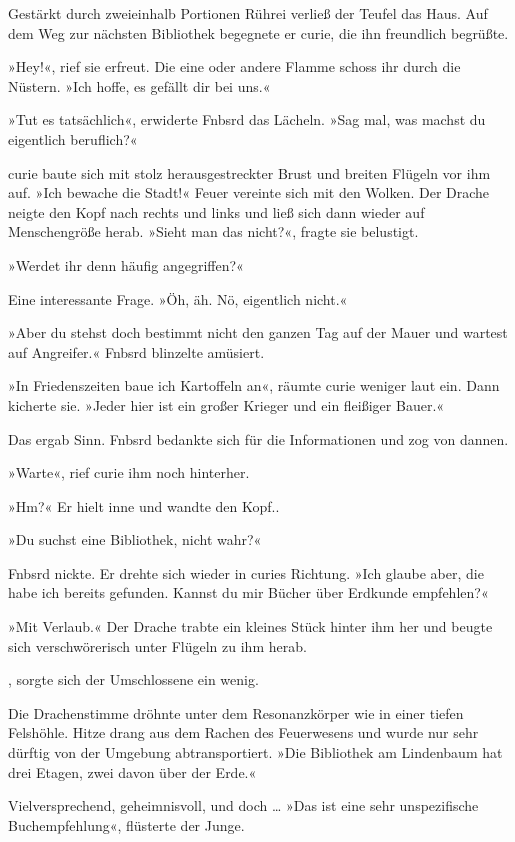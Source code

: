 Gestärkt durch zweieinhalb Portionen Rührei verließ der Teufel das Haus. Auf dem Weg zur nächsten Bibliothek begegnete er curie, die ihn freundlich begrüßte.

»Hey!«, rief sie erfreut. Die eine oder andere Flamme schoss ihr durch die Nüstern. »Ich hoffe, es gefällt dir bei uns.«

»Tut es tatsächlich«, erwiderte Fnbsrd das Lächeln. »Sag mal, was machst du eigentlich beruflich?«

curie baute sich mit stolz herausgestreckter Brust und breiten Flügeln vor ihm auf. »Ich bewache die Stadt!« Feuer vereinte sich mit den Wolken. Der Drache neigte den Kopf nach rechts und links und ließ sich dann wieder auf Menschengröße herab. »Sieht man das nicht?«, fragte sie belustigt.

»Werdet ihr denn häufig angegriffen?«

Eine interessante Frage. »Öh, äh. Nö, eigentlich nicht.«

»Aber du stehst doch bestimmt nicht den ganzen Tag auf der Mauer und wartest auf Angreifer.« Fnbsrd blinzelte amüsiert.

»In Friedenszeiten baue ich Kartoffeln an«, räumte curie weniger laut ein. Dann kicherte sie. »Jeder hier ist ein großer Krieger und ein fleißiger Bauer.«

Das ergab Sinn. Fnbsrd bedankte sich für die Informationen und zog von dannen.

»Warte«, rief curie ihm noch hinterher.

»Hm?« Er hielt inne und wandte den Kopf..

»Du suchst eine Bibliothek, nicht wahr?«

Fnbsrd nickte. Er drehte sich wieder in curies Richtung. »Ich glaube aber, die habe ich bereits gefunden. Kannst du mir Bücher über Erdkunde empfehlen?«

»Mit Verlaub.« Der Drache trabte ein kleines Stück hinter ihm her und beugte sich verschwörerisch unter Flügeln zu ihm herab.

, sorgte sich der Umschlossene ein wenig.

Die Drachenstimme dröhnte unter dem Resonanzkörper wie in einer tiefen Felshöhle. Hitze drang aus dem Rachen des Feuerwesens und wurde nur sehr dürftig von der Umgebung abtransportiert. »Die Bibliothek am Lindenbaum hat drei Etagen, zwei davon über der Erde.«

Vielversprechend, geheimnisvoll, und doch … »Das ist eine sehr unspezifische Buchempfehlung«, flüsterte der Junge.

